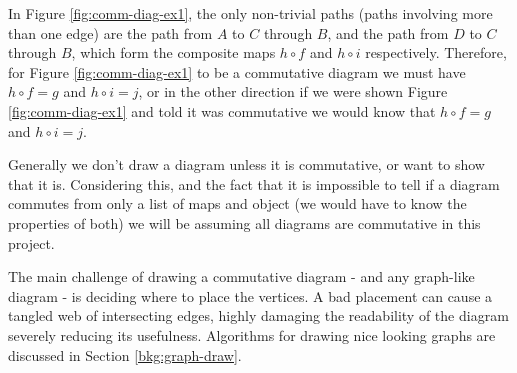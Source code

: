 \documentclass[logo,bsc,singlespacing,parskip]{infthesis}
\theoremstyle{definition}
\begin{document}
In Figure \ref{fig:comm-diag-ex1}, the only non-trivial paths (paths involving more than one edge) are the path from $A$ to $C$ through $B$, and the path from $D$ to $C$ through $B$, which form the composite maps $h \circ f$ and $h \circ i$ respectively. Therefore, for Figure \ref{fig:comm-diag-ex1} to be a commutative diagram we must have $h \circ f = g$ and $h \circ i = j$, or in the other direction if we were shown Figure \ref{fig:comm-diag-ex1} and told it was commutative we would know that $h \circ f = g$ and $h \circ i = j$.

Generally we don't draw a diagram unless it is commutative, or want to show that it is. Considering this, and the fact that it is impossible to tell if a diagram commutes from only a list of maps and object (we would have to know the properties of both) we will be assuming all diagrams are commutative in this project.

The main challenge of drawing a commutative diagram - and any graph-like diagram - is deciding where to place the vertices. A bad placement can cause a tangled web of intersecting edges, highly damaging the readability of the diagram severely reducing its usefulness. Algorithms for drawing nice looking graphs are discussed in Section \ref{bkg:graph-draw}.
\end{document}
